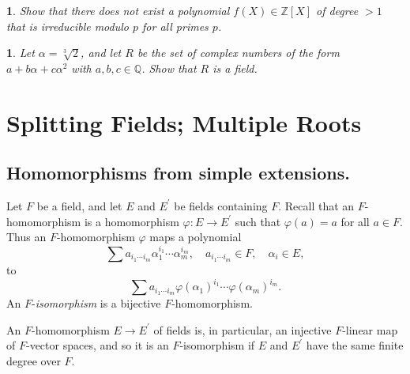 \documentclass[a4paper,11pt,final,openany]{memoir}
\newtheorem{exercise}[Y]{}
\theoremstyle{nonumberplain}
\begin{document}
\begin{exercise}
\label{x4b}Show that there does not exist a polynomial $f(X)\in\mathbb{Z}%
{}[X]$ of degree $>1$ that is irreducible modulo $p$ for all primes $p$.
\end{exercise}

\begin{exercise}
\label{x4c}Let $\alpha=\sqrt[3]{2}$, and let $R$ be the set of complex numbers
of the form $a+b\alpha+c\alpha^{2}$ with $a,b,c\in\mathbb{Q}{}$. Show that $R$
is a field.
\end{exercise}

\clearpage


\chapter{Splitting Fields; Multiple Roots}

\section{Homomorphisms from simple extensions.}

\noindent Let $F$ be a field, and let $E$ and $E^{\prime}$ be fields
containing $F$. Recall that an $F$-homomorphism\/ is a homomorphism
$\varphi\colon E\rightarrow E^{\prime}$ such that $\varphi(a)=a$ for all $a\in
F$. Thus an $F$-homomorphism $\varphi$ maps a polynomial
\[
\sum a_{i_{1}\cdots i_{m}}\alpha_{1}^{i_{1}}\cdots\alpha_{m}^{i_{m}},\quad
a_{i_{1}\cdots i_{m}}\in F,\quad\alpha_{i}\in E,
\]
to
\[
\sum a_{i_{1}\cdots i_{m}}\varphi(\alpha_{1})^{i_{1}}\cdots\varphi(\alpha
_{m})^{i_{m}}.
\]
An $F$-\emph{isomorphism}%
%
\emph{\/} is a bijective $F$-homomorphism.

An $F$-homomorphism $E\rightarrow E^{\prime}$ of fields is, in particular, an
injective $F$-linear map of $F$-vector spaces, and so it is an $F$-isomorphism
if $E$ and $E^{\prime}$ have the same finite degree over $F$.
\end{document}
